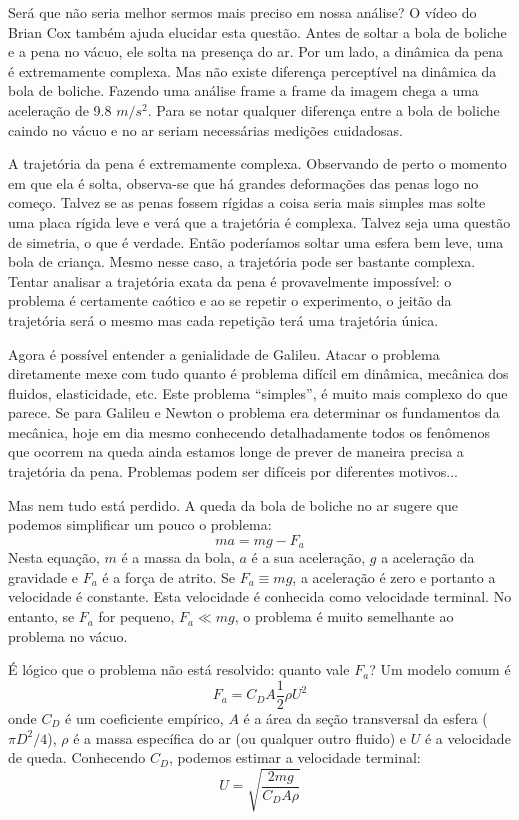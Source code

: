 \documentclass[article,12pt,oneside,a4paper,english,brazil,sumario=tradicional]{abntex2}
\begin{document}
Será que não seria melhor sermos mais preciso em nossa análise? O vídeo do Brian Cox também ajuda elucidar esta questão. Antes de soltar a bola de boliche e a pena no vácuo, ele solta na presença do ar. Por um lado, a dinâmica da pena é extremamente complexa. Mas não existe diferença perceptível na dinâmica da bola de boliche. Fazendo uma análise frame a frame da imagem chega a uma aceleração de 9.8 $m/s^2$. Para se notar qualquer diferença entre a bola de boliche caindo no vácuo e no ar seriam necessárias medições cuidadosas.

A trajetória da pena é extremamente complexa. Observando de perto o momento em que ela é solta, observa-se que há grandes deformações das penas logo no começo. Talvez se as penas fossem rígidas a coisa seria mais simples mas solte uma placa rígida leve e verá que a trajetória é complexa. Talvez seja uma questão de simetria, o que é verdade. Então poderíamos soltar uma esfera bem leve, uma bola de criança. Mesmo nesse caso, a trajetória pode ser bastante complexa. Tentar analisar a trajetória exata da pena é provavelmente impossível: o problema é certamente caótico e ao se repetir o experimento, o jeitão da trajetória será o mesmo mas cada repetição terá uma trajetória única.

Agora é possível entender a genialidade de Galileu. Atacar o problema diretamente mexe com tudo quanto é problema difícil em dinâmica, mecânica dos fluidos, elasticidade, etc. Este problema ``simples'', é muito mais complexo do que parece. Se para Galileu e Newton o problema era determinar os fundamentos da mecânica, hoje em dia mesmo conhecendo detalhadamente todos os fenômenos que ocorrem na queda ainda estamos longe de prever de maneira precisa a trajetória da pena. Problemas podem ser difíceis por diferentes motivos...

Mas nem tudo está perdido. A queda da bola de boliche no ar sugere que podemos simplificar um pouco o problema:
\[
m a = m g - F_a
\]
Nesta equação, $m$ é a massa da bola, $a$ é a sua aceleração, $g$ a aceleração da gravidade e $F_a$ é a força de atrito. Se $F_a \equiv mg$, a aceleração é zero e portanto a velocidade é constante. Esta velocidade é conhecida como velocidade terminal. No entanto, se $F_a$ for pequeno, $F_a \ll mg$, o problema é muito semelhante ao problema no vácuo.

É lógico que o problema não está resolvido: quanto vale $F_a$? Um modelo comum é
\[
F_a = C_D A \frac{1}{2}\rho U^2
\]
onde $C_D$ é um coeficiente empírico, $A$ é a área da seção transversal da esfera ($\pi D^2 /4$), $\rho$ é a massa específica do ar (ou qualquer outro fluido) e $U$ é a velocidade de queda. Conhecendo $C_D$, podemos estimar a velocidade terminal:
\[
U = \sqrt{\frac{2 m g}{C_D A \rho}}
\]
\end{document}
